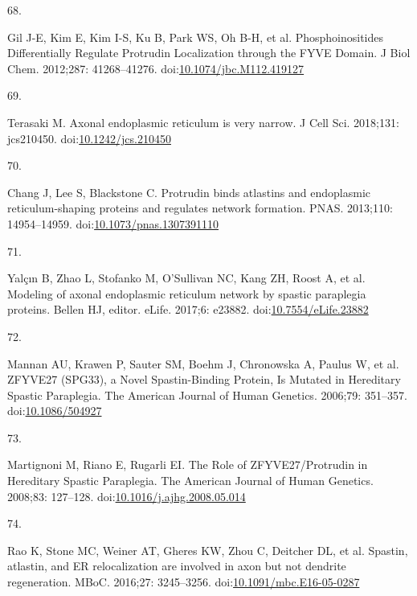 \documentclass[
  12pt,
  a4paper,
]{book}
\newlength{\cslhangindent}
\newlength{\csllabelwidth}
\newenvironment{CSLReferences}[2] %
 {\begin{list}{}{%
  \setlength{\itemindent}{0pt}
  \setlength{\leftmargin}{0pt}
  \setlength{\parsep}{0pt}
  \ifodd #1
   \setlength{\leftmargin}{\cslhangindent}
   \setlength{\itemindent}{-1\cslhangindent}
  \fi
  \setlength{\itemsep}{#2\baselineskip}}}
 {\end{list}}
\newcommand{\CSLLeftMargin}[1]{\parbox[t]{\csllabelwidth}{\strut#1\strut}}
\newcommand{\CSLRightInline}[1]{\parbox[t]{\linewidth - \csllabelwidth}{\strut#1\strut}}
\begin{document}
\begin{CSLReferences}{0}{1}
\CSLLeftMargin{68. }%
\CSLRightInline{Gil J-E, Kim E, Kim I-S, Ku B, Park WS, Oh B-H, et al. Phosphoinositides {Differentially Regulate Protrudin Localization} through the {FYVE Domain}. J Biol Chem. 2012;287: 41268--41276. doi:\href{https://doi.org/10.1074/jbc.M112.419127}{10.1074/jbc.M112.419127}}

\CSLLeftMargin{69. }%
\CSLRightInline{Terasaki M. Axonal endoplasmic reticulum is very narrow. J Cell Sci. 2018;131: jcs210450. doi:\href{https://doi.org/10.1242/jcs.210450}{10.1242/jcs.210450}}

\CSLLeftMargin{70. }%
\CSLRightInline{Chang J, Lee S, Blackstone C. Protrudin binds atlastins and endoplasmic reticulum-shaping proteins and regulates network formation. PNAS. 2013;110: 14954--14959. doi:\href{https://doi.org/10.1073/pnas.1307391110}{10.1073/pnas.1307391110}}

\CSLLeftMargin{71. }%
\CSLRightInline{Yalçın B, Zhao L, Stofanko M, O'Sullivan NC, Kang ZH, Roost A, et al. Modeling of axonal endoplasmic reticulum network by spastic paraplegia proteins. Bellen HJ, editor. eLife. 2017;6: e23882. doi:\href{https://doi.org/10.7554/eLife.23882}{10.7554/eLife.23882}}

\CSLLeftMargin{72. }%
\CSLRightInline{Mannan AU, Krawen P, Sauter SM, Boehm J, Chronowska A, Paulus W, et al. {ZFYVE27} ({SPG33}), a {Novel Spastin-Binding Protein}, {Is Mutated} in {Hereditary Spastic Paraplegia}. The American Journal of Human Genetics. 2006;79: 351--357. doi:\href{https://doi.org/10.1086/504927}{10.1086/504927}}

\CSLLeftMargin{73. }%
\CSLRightInline{Martignoni M, Riano E, Rugarli EI. The {Role} of {ZFYVE27}/{Protrudin} in {Hereditary Spastic Paraplegia}. The American Journal of Human Genetics. 2008;83: 127--128. doi:\href{https://doi.org/10.1016/j.ajhg.2008.05.014}{10.1016/j.ajhg.2008.05.014}}

\CSLLeftMargin{74. }%
\CSLRightInline{Rao K, Stone MC, Weiner AT, Gheres KW, Zhou C, Deitcher DL, et al. Spastin, atlastin, and {ER} relocalization are involved in axon but not dendrite regeneration. MBoC. 2016;27: 3245--3256. doi:\href{https://doi.org/10.1091/mbc.E16-05-0287}{10.1091/mbc.E16-05-0287}}


\end{CSLReferences}
\end{document}
